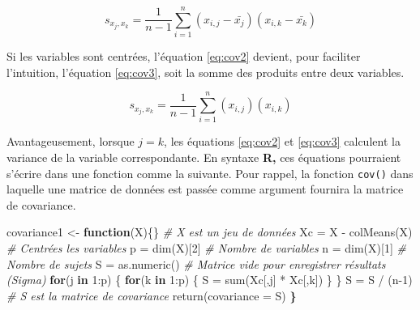 \documentclass[
]{book}
\newenvironment{Shaded}{}{}
\newcommand{\AttributeTok}[1]{#1}
\newcommand{\CommentTok}[1]{\textit{#1}}
\newcommand{\ControlFlowTok}[1]{\textbf{#1}}
\newcommand{\DecValTok}[1]{#1}
\newcommand{\ErrorTok}[1]{\textbf{#1}}
\newcommand{\FunctionTok}[1]{#1}
\newcommand{\NormalTok}[1]{#1}
\newcommand{\OtherTok}[1]{#1}
\newcommand{\SpecialCharTok}[1]{#1}
\begin{document}
\begin{equation}
s_{x_j,x_k}=\frac{1}{n-1}\sum_{i=1}^n(x_{i,j}-\bar{x_j})(x_{i,k}-\bar{x_k})
\label{eq:cov2}
\end{equation}

Si les variables sont centrées, l'équation \eqref{eq:cov2} devient, pour faciliter l'intuition, l'équation \eqref{eq:cov3}, soit la somme des produits entre deux variables.

\begin{equation}
s_{x_j,x_k}=\frac{1}{n-1}\sum_{i=1}^n(x_{i,j})(x_{i,k})
\label{eq:cov3}
\end{equation}

Avantageusement, lorsque \(j=k\), les équations \eqref{eq:cov2} et \eqref{eq:cov3} calculent la variance de la variable correspondante. En syntaxe \textbf{R,} ces équations pourraient s'écrire dans une fonction comme la suivante. Pour rappel, la fonction \texttt{cov()} dans laquelle une matrice de données est passée comme argument fournira la matrice de covariance.

\begin{Shaded}
\begin{Highlighting}[]
\NormalTok{covariance1 }\OtherTok{\textless{}{-}} \ControlFlowTok{function}\NormalTok{(X)\{\} }
\CommentTok{\# X est un jeu de données}
\NormalTok{Xc }\OtherTok{=}\NormalTok{ X }\SpecialCharTok{{-}} \FunctionTok{colMeans}\NormalTok{(X) }\CommentTok{\# Centrées les variables}
\NormalTok{p }\OtherTok{=} \FunctionTok{dim}\NormalTok{(X)[}\DecValTok{2}\NormalTok{]    }\CommentTok{\# Nombre de variables }
\NormalTok{n }\OtherTok{=} \FunctionTok{dim}\NormalTok{(X)[}\DecValTok{1}\NormalTok{]    }\CommentTok{\# Nombre de sujets}
\NormalTok{S }\OtherTok{=} \FunctionTok{as.numeric}\NormalTok{() }\CommentTok{\# Matrice vide pour enregistrer résultats (Sigma)}
\ControlFlowTok{for}\NormalTok{(j }\ControlFlowTok{in} \DecValTok{1}\SpecialCharTok{:}\NormalTok{p) \{}
  \ControlFlowTok{for}\NormalTok{(k }\ControlFlowTok{in} \DecValTok{1}\SpecialCharTok{:}\NormalTok{p) \{}
\NormalTok{    S }\OtherTok{=} \FunctionTok{sum}\NormalTok{(Xc[,j] }\SpecialCharTok{*}\NormalTok{ Xc[,k])}
\NormalTok{  \}}
\NormalTok{\}}
\NormalTok{S }\OtherTok{=}\NormalTok{ S }\SpecialCharTok{/}\NormalTok{ (n}\DecValTok{{-}1}\NormalTok{)}
\CommentTok{\# S est la matrice de covariance}
\FunctionTok{return}\NormalTok{(}\AttributeTok{covariance =}\NormalTok{ S)}
\ErrorTok{\}}
\end{Highlighting}
\end{Shaded}
\end{document}
